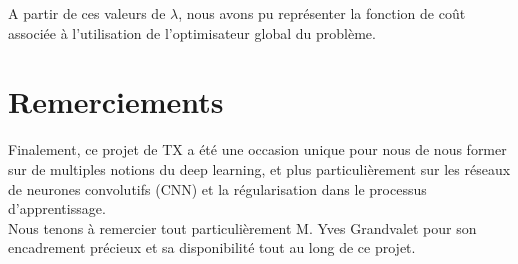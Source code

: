 \documentclass[12pt,english, openany]{book}
\begin{document}
A partir de ces valeurs de $\lambda$, nous avons pu représenter la fonction de coût associée à l'utilisation de l'optimisateur global du problème.

\chapter{Remerciements}

Finalement, ce projet de TX a été une occasion unique pour nous de nous former sur de multiples notions du deep learning, et plus particulièrement sur les réseaux de neurones convolutifs (CNN) et la régularisation dans le processus d'apprentissage.\\


Nous tenons à remercier tout particulièrement M. Yves Grandvalet pour son encadrement précieux et sa disponibilité tout au long de ce projet.


\end{document}
